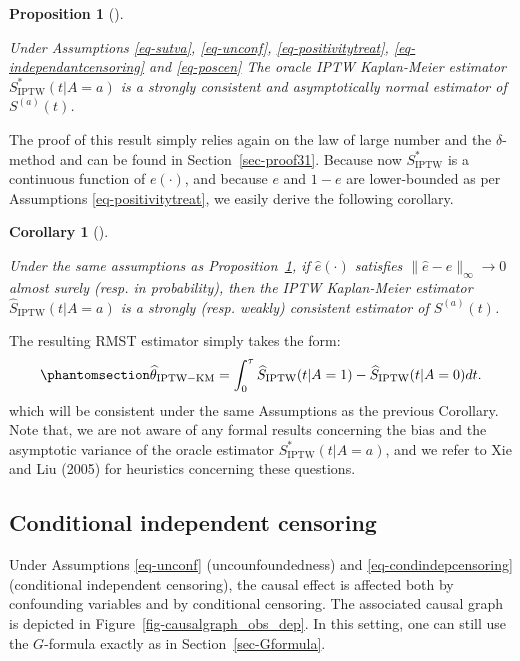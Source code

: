 \documentclass[
  11pt,
  a4paper,
]{article}
\theoremstyle{plain}
\theoremstyle{plain}
\newtheorem{corollary}{Corollary}[section]
\theoremstyle{plain}
\newtheorem{proposition}{Proposition}[section]
\theoremstyle{definition}
\theoremstyle{remark}
\begin{document}
\begin{proposition}[]\protect\hypertarget{prp-iptwkm}{}\label{prp-iptwkm}

Under Assumptions
\ref{eq-sutva}, \ref{eq-unconf}, \ref{eq-positivitytreat}, \ref{eq-independantcensoring}
and \ref{eq-poscen} The oracle IPTW Kaplan-Meier estimator
\(S^*_{\mathrm{IPTW}}(t | A=a)\) is a strongly consistent and
asymptotically normal estimator of \(S^{(a)}(t)\).

\end{proposition}

The proof of this result simply relies again on the law of large number
and the \(\delta\)-method and can be found in Section~\ref{sec-proof31}.
Because now \(S^*_{\mathrm{IPTW}}\) is a continuous function of
\(e(\cdot)\), and because \(e\) and \(1-e\) are lower-bounded as per
Assumptions \ref{eq-positivitytreat}, we easily derive the following
corollary.

\begin{corollary}[]\protect\hypertarget{cor-iptwkm}{}\label{cor-iptwkm}

Under the same assumptions as Proposition~\ref{prp-iptwkm}, if
\(\widehat e(\cdot)\) satisfies \(\|\widehat e-e\|_{\infty} \to 0\)
almost surely (resp. in probability), then the IPTW Kaplan-Meier
estimator \(\hat S_{\mathrm{IPTW}}(t | A=a)\) is a strongly (resp.
weakly) consistent estimator of \(S^{(a)}(t)\).

\end{corollary}

The resulting RMST estimator simply takes the form:
\begin{equation}\phantomsection\label{eq-RMST_IPTWKM}{
\widehat{\theta}_{\mathrm{IPTW-KM}} = \int_{0}^{\tau}\widehat{S}_{\mathrm{IPTW}}(t|A=1)-\widehat{S}_{\mathrm{IPTW}}(t|A=0)dt.
}\end{equation} which will be consistent under the same Assumptions as
the previous Corollary. Note that, we are not aware of any formal
results concerning the bias and the asymptotic variance of the oracle
estimator \(S^*_{\mathrm{IPTW}}(t | A=a)\), and we refer to Xie and Liu
(2005) for heuristics concerning these questions.

\subsection{Conditional independent censoring}\label{sec-obscondcens}

Under Assumptions \ref{eq-unconf} (uncounfoundedness) and
\ref{eq-condindepcensoring} (conditional independent censoring), the
causal effect is affected both by confounding variables and by
conditional censoring. The associated causal graph is depicted in
Figure~\ref{fig-causalgraph_obs_dep}. In this setting, one can still use
the \(G\)-formula exactly as in Section~\ref{sec-Gformula}.
\end{document}
